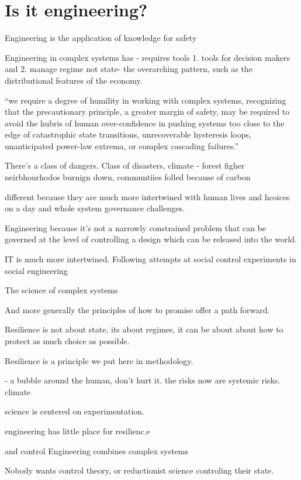 \section{Is it engineering?}

Engineering is the application of knowledge for safety \cite{ontarioProfessionalEngineersAct1990}

Engineering in complex systems has - requires tools
1. tools for decision makers and 
2. manage regime not state- the overarching pattern, such as the distributional features of the economy. 


``we require a degree of humility in working with complex systems, recognizing that the precautionary principle, a greater margin of safety, may be required to avoid the hubris of human over-confidence in pushing systems too close to the edge of catastrophic state transitions, unrecoverable hysteresis loops, unanticipated power-law extrema, or complex cascading failures.'' 


There's a class of dangers.
Class of disasters, climate - forest figher
neirbhourhodos burnign down, communtiies folled because of carbon

different because they are much more intertwined with human lives and hcoices on a day 
and whole system governance challenges.

Engineering
because it's not a narrowly constrained problem that can be governed at the level of controlling a design which can be released into the world. 

IT is much more intertwined.
Following attempts at social control
experiments in social engineering

The science of complex systems


And more generally the principles of how to promise offer a path forward. 

Resilience is not about state, its about regimes, it can be about about how to protect as much choice as possible.

Resilience is a principle we put here in methodology. 




- a bubble around the human, don't hurt it.
the risks now are systemic risks.
climate

science is centered on experimentation.


engineering has little place for resilienc.e

and control
Engineering combines 
complex systems

Nobody wants control theory, or reductionist science controling their state.